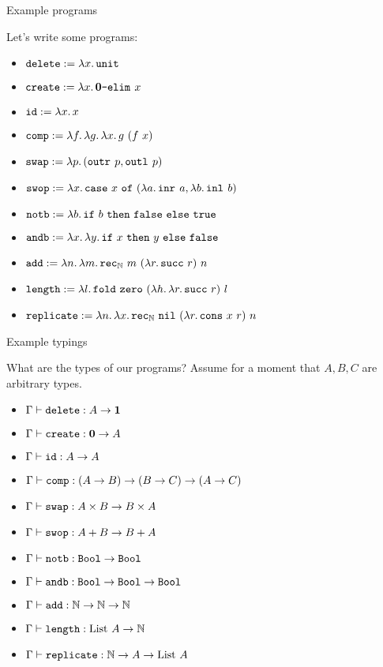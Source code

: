 \documentclass{beamer}
\begin{document}
\begin{frame}{Example programs}

Let's write some programs:

\begin{itemize}
  \item $\delete := \fun{x}{\unit}$
  \item $\create := \fun{x}{\emptyelim{x}}$
  \item $\id := \fun{x}{x}$
  \item $\comp := \fun{f}{\fun{g}{\fun{x}{\app{g}{(\app{f}{x})}}}}$
  \item $\swap := \fun{p}{\pair{\outr{p}}{\outl{p}}}$
  \item $\swop := \fun{x}{\case{x}{\fun{a}{\inr{a}}}{\fun{b}{\inl{b}}}}$
  \item $\notb := \fun{b}{\boolelim{b}{\bfalse}{\btrue}}$
  \item $\andb := \fun{x}{\fun{y}{\boolelim{x}{y}{\bfalse}}}$
  \item $\add := \fun{n}{\fun{m}{\natelim{m}{(\fun{r}{\succ[r]})}{n}}}$
  \item $\length := \fun{l}{\listelim{\zero}{(\fun{h}{\fun{r}{\succ[r]}})}{l}}$
  \item $\replicate := \fun{n}{\fun{x}{\natelim{\nil}{(\fun{r}{\cons{x}{r}})}{n}}}$
\end{itemize}

\end{frame}

\begin{frame}{Example typings}

What are the types of our programs? Assume for a moment that $A, B, C$ are arbitrary types.

\begin{itemize}
  \item $\typing{\delete}{\Fun{A}{\Unit}}$
  \item $\typing{\create}{\Fun{\Empty}{A}}$
  \item $\typing{\id}{\Fun{A}{A}}$
  \item $\typing{\comp}{\Fun{(\Fun{A}{B})}{\Fun{(\Fun{B}{C})}{(\Fun{A}{C})}}}$
  \item $\typing{\swap}{\Fun{\Prod{A}{B}}{\Prod{B}{A}}}$
  \item $\typing{\swop}{\Fun{\Sum{A}{B}}{\Sum{B}{A}}}$
  \item $\typing{\notb}{\Fun{\Bool}{\Bool}}$
  \item $\typing{\andb}{\Fun{\Bool}{\Fun{\Bool}{\Bool}}}$
  \item $\typing{\add}{\Fun{\Nat}{\Fun{\Nat}{\Nat}}}$
  \item $\typing{\length}{\Fun{\List{A}}{\Nat}}$
  \item $\typing{\replicate}{\Fun{\Nat}{\Fun{A}{\List{A}}}}$
\end{itemize}

\end{frame}
\end{document}
